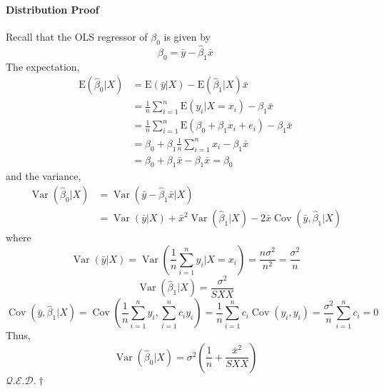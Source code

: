 \documentclass[10pt]{article}
\newcommand{\qed}{\hfill $\mathcal{Q}.\mathcal{E}.\mathcal{D}.\dagger$}
\begin{document}
\paragraph{Distribution Proof}
Recall that the OLS regressor of $\beta_0$ is given by
\begin{equation*}
    \hat{\beta}_{0}=\bar{y}-\hat{\beta}_{1} \bar{x}
\end{equation*}
The expectation,
\begin{align*}
    \mathrm{E}\left(\hat{\beta}_{0} | X\right)
    &= \mathrm{E}(\bar{y} | X)-\mathrm{E}\left(\hat{\beta}_{1} | X\right) \bar{x} \\
    &= \frac{1}{n} \sum_{i=1}^{n} \mathrm{E}\left(y_{i} | X=x_{i}\right) - \beta_{1} \bar{x} \\
    &= \frac{1}{n} \sum_{i=1}^{n} \mathrm{E}\left(\beta_{0}+\beta_{1} x_{i}+e_{i}\right) - \beta_{1} \bar{x} \\
    &= \beta_{0}+\beta_{1} \frac{1}{n} \sum_{i=1}^{n} x_{i} - \beta_{1} \bar{x} \\
    &= \beta_{0}+\beta_{1} \bar{x} - \beta_{1} \bar{x} = \beta_0
\end{align*}
and the variance,
\begin{align*}
    \operatorname{Var}\left(\hat{\beta}_{0} | X\right) &=\operatorname{Var}\left(\bar{y}-\hat{\beta}_{1} \bar{x} | X\right) \\ &=\operatorname{Var}(\bar{y} | X)+\bar{x}^{2} \operatorname{Var}\left(\hat{\beta}_{1} | X\right)-2 \bar{x} \operatorname{Cov}\left(\bar{y}, \hat{\beta}_{1} | X\right)
\end{align*}
where
\begin{equation*}
    \operatorname{Var}(\bar{y} | X)=\operatorname{Var}\left(\frac{1}{n} \sum_{i=1}^{n} y_{i} | X=x_{i}\right)=\frac{n \sigma^{2}}{n^{2}}=\frac{\sigma^{2}}{n}
\end{equation*}
\begin{equation*}
    \operatorname{Var}\left(\hat{\beta}_{1} | X\right)=\frac{\sigma^{2}}{S X X}
\end{equation*}
\begin{equation*}
    \operatorname{Cov}\left(\bar{y}, \hat{\beta}_{1} | X\right)=\operatorname{Cov}\left(\frac{1}{n} \sum_{i=1}^{n} y_{i}, \sum_{i=1}^{n} c_{i} y_{i}\right)=\frac{1}{n} \sum_{i=1}^{n} c_{i} \operatorname{Cov}\left(y_{i}, y_{i}\right)=\frac{\sigma^{2}}{n} \sum_{i=1}^{n} c_{i}=0
\end{equation*}
Thus,
\begin{equation*}
    \operatorname{Var}\left(\hat{\beta}_{0} | X\right)=\sigma^{2}\left(\frac{1}{n}+\frac{\bar{x}^{2}}{S X X}\right)
\end{equation*}
\qed
\end{document}

